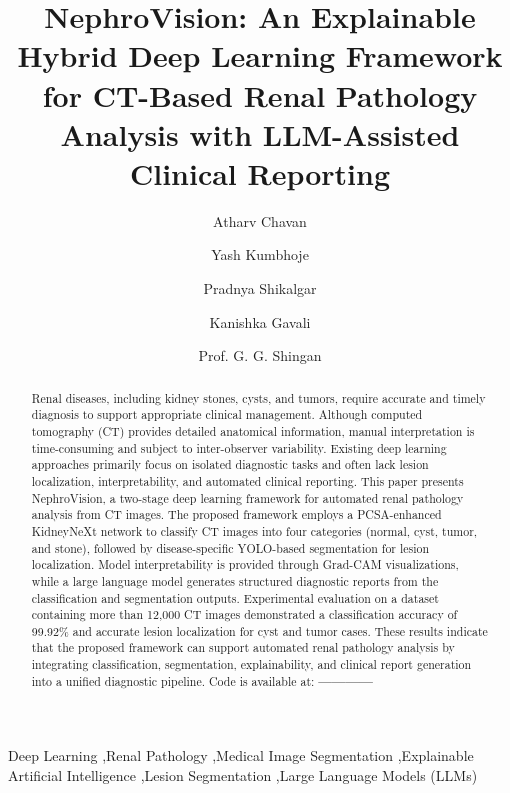 \documentclass[]{elsarticle}
\begin{document}
\begin{frontmatter}

\title{NephroVision: An Explainable Hybrid Deep Learning Framework for CT-Based Renal Pathology Analysis with LLM-Assisted Clinical Reporting}
\author[label1]{Atharv Chavan}

\author[label1]{Yash Kumbhoje}

\author[label1]{Pradnya Shikalgar}

\author[label1]{Kanishka Gavali}

\author[label1]{Prof. G. G. Shingan}



\begin{abstract}
Renal diseases, including kidney stones, cysts, and tumors, require accurate and timely diagnosis to support appropriate clinical management. Although computed tomography (CT) provides detailed anatomical information, manual interpretation is time-consuming and subject to inter-observer variability. Existing deep learning approaches primarily focus on isolated diagnostic tasks and often lack lesion localization, interpretability, and automated clinical reporting. This paper presents NephroVision, a two-stage deep learning framework for automated renal pathology analysis from CT images. The proposed framework employs a PCSA-enhanced KidneyNeXt network to classify CT images into four categories (normal, cyst, tumor, and stone), followed by disease-specific YOLO-based segmentation for lesion localization. Model interpretability is provided through Grad-CAM visualizations, while a large language model generates structured diagnostic reports from the classification and segmentation outputs. Experimental evaluation on a dataset containing more than 12,000 CT images demonstrated a classification accuracy of 99.92\% and accurate lesion localization for cyst and tumor cases. These results indicate that the proposed framework can support automated renal pathology analysis by integrating classification, segmentation, explainability, and clinical report generation into a unified diagnostic pipeline. Code is available at: \textbf{------------}
\end{abstract}

\begin{keyword}
Deep Learning \sep Renal Pathology \sep Medical Image Segmentation \sep Explainable Artificial Intelligence \sep Lesion Segmentation \sep Large Language Models (LLMs)
\end{keyword}
    
\end{frontmatter}
\end{document}
